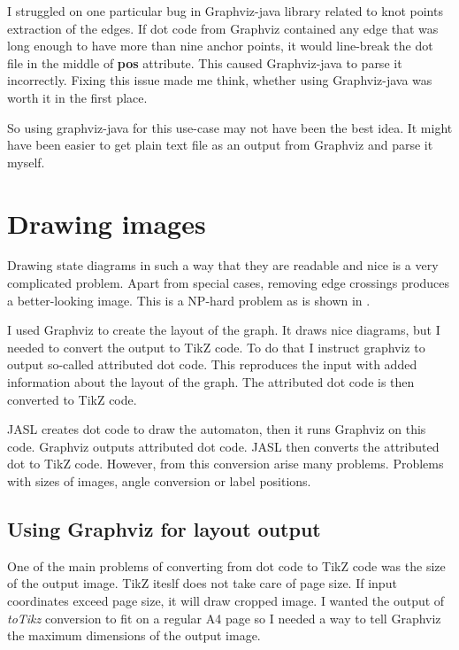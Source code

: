 \documentclass{ctuthesis}
\begin{document}
I struggled on one particular bug in Graphviz-java library related to knot points extraction of the edges. If dot code from Graphviz contained any edge that was long enough to have more than nine anchor points, it would line-break the dot file in the middle of \textbf{pos} attribute. This caused Graphviz-java to parse it incorrectly. Fixing this issue made me think, whether using Graphviz-java was worth it in the first place.

So using graphviz-java for this use-case may not have been the best idea. It might have been easier to get plain text file as an output from Graphviz and parse it myself. 

\chapter{Drawing images}
Drawing state diagrams in such a way that they are readable and nice is a very complicated problem. Apart from special cases, removing edge crossings produces a better-looking image. This is a NP-hard problem as is shown in \cite{crossing-problem}.

I used Graphviz to create the layout of the graph. It draws nice diagrams, but I needed to convert the output to TikZ code. To do that I instruct graphviz to output so-called attributed dot code. This reproduces the input with added information about the layout of the graph. The attributed dot code is then converted to TikZ code. 


JASL creates dot code to draw the automaton, then it runs Graphviz on this code. Graphviz outputs attributed dot code. JASL then converts the attributed dot to TikZ code. However, from this conversion arise many problems. Problems with sizes of images, angle conversion or label positions. 

\section{Using Graphviz for layout output}
\label{sec:problems_graphviz}
One of the main problems of converting from dot code to TikZ code was the size of the output image. TikZ iteslf does not take care of page size. If input coordinates exceed page size, it will draw cropped image. I wanted the output of \textit{toTikz} conversion to fit on a regular A4 page so I needed a way to tell Graphviz the maximum dimensions of the output image. 
\end{document}
